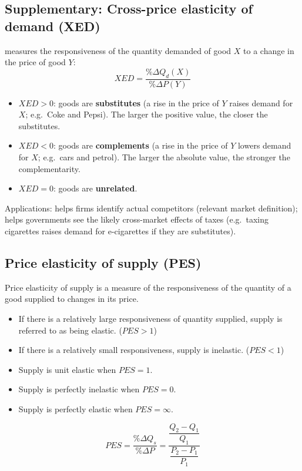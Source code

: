 \subsection{Supplementary: Cross-price elasticity of demand (XED)}
 measures the responsiveness of the quantity demanded of good $X$ to a change in the price of good $Y$:
\[XED=\dfrac{\%\Delta Q_d(X)}{\%\Delta P(Y)}\]
\begin{itemize}
  \item $XED>0$: goods are \textbf{substitutes} (a rise in the price of $Y$ raises demand for $X$; e.g.\ Coke and Pepsi). The larger the positive value, the closer the substitutes.
  \item $XED<0$: goods are \textbf{complements} (a rise in the price of $Y$ lowers demand for $X$; e.g.\ cars and petrol). The larger the absolute value, the stronger the complementarity.
  \item $XED=0$: goods are \textbf{unrelated}.
\end{itemize}
Applications: helps firms identify actual competitors (relevant market definition); helps governments see the likely cross-market effects of taxes (e.g.\ taxing cigarettes raises demand for e-cigarettes if they are substitutes).
\subsection{Price elasticity of supply (PES)}
Price elasticity of supply is a measure of the responsiveness of the quantity of a good supplied to changes in its price. 
\begin{itemize}
  \item If there is a relatively large responsiveness of quantity supplied, supply is referred to as being elastic. ($PES>1$)
  \item If there is a relatively small responsiveness, supply is inelastic. ($PES<1$)
  \item Supply is unit elastic when $PES = 1$.
  \item Supply is perfectly inelastic when $PES = 0$.
  \item Supply is perfectly elastic when $PES =\infty$.
\end{itemize}
\[PES=\dfrac{\%\Delta Q_s}{\%\Delta P}=\dfrac{\dfrac{Q_2-Q_1}{Q_1}}{\dfrac{P_2-P_1}{P_1}}\]
